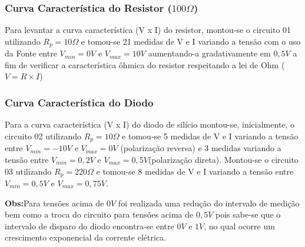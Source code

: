         \subsubsection{Curva Característica do Resistor ($100\Omega$)}
            Para levantar a curva característica (V x I) do resistor, montou-se o circuito 01 utilizando $R_{p}=10\Omega$ e tomou-se 21 medidas
            de V e I variando a tensão com o uso da Fonte entre $V_{min}=0V$ e $V_{max}=10V$ aumentando-a gradativamente em $0,5V$ a fim de
            verificar a característica ôhmica do resistor respeitando a lei de Ohm ($V=R\times I$)
        \subsubsection{Curva Característica do Diodo}
            Para a curva característica (V x I) do diodo de silício montou-se, inicialmente, o circuito 02 utilizando $R_{p}=10\Omega$ e tomou-se 5
            medidas de V e I variando a tensão entre $V_{min}=-10V$ e $V_{max}=0V$ (polarização reversa) e 3 medidas variando a tensão entre
            $V_{min}=0,2V$ e $V_{max}=0,5V$(polarização direta).\newline
            Montou-se o circuito 03 utilizando $R_{p}=220\Omega$ e tomou-se 8 medidas de V e I variando a tensão entre $V_{min}=0,5V$ e $V_{max}=0,75V$.
            \newline
            
            \textbf{Obs:}Para tensões acima de $0V$ foi realizada uma redução do intervalo de medição bem como a troca do circuito para tensões acima de
            $0,5V$ pois sabe-se que o intervalo de disparo do diodo encontra-se entre $0V$ e $1V$, no qual ocorre um crescimento exponencial da corrente
            elétrica.